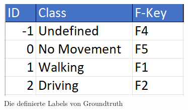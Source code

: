 \begin{figure}
	\centering
	\includegraphics[width=0.6\linewidth]{Bilder/TabCalimotoLabelsID2.png} %
	\caption{Die definierte Labels von Groundtruth}
	\label{fig:TabCalimotoLabelsID}
\end{figure}





















